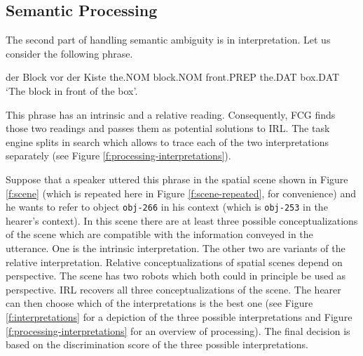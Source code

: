 \subsection{Semantic Processing}
\label{s:semantic-ambiguity-semantic}
The second part of handling semantic ambiguity is in interpretation. 
Let us consider the following phrase.
\begin{example}
\label{e:der-block-vor-der-kiste-repeated}
\gll der Block vor der Kiste 
the.NOM block.NOM front.PREP the.DAT box.DAT 
\glt `The block in front of the box'.
\glend
\end{example}
This phrase has an intrinsic and a relative reading. Consequently, FCG finds
those two readings and passes them as potential solutions to IRL. 
The task engine splits in search which allows to trace each of the two interpretations
separately (see Figure \ref{f:processing-interpretations}).

Suppose that a speaker uttered this phrase in the spatial scene 
shown in Figure \ref{f:scene} (which is repeated here in Figure \ref{f:scene-repeated}, 
for convenience) and he wants to refer to object {\footnotesize\tt obj-266} in his context (which
is {\footnotesize\tt obj-253} in the hearer's context). 
In this scene there are at least three possible conceptualizations of the
scene which are compatible with the information conveyed in the utterance. 
One is the intrinsic interpretation. The other two are variants of the relative
interpretation. Relative conceptualizations of spatial scenes depend on perspective.
The scene has two robots which both could in principle be used as perspective.
IRL recovers all three conceptualizations of the scene. The hearer can then
choose which of the interpretations is the best one (see Figure \ref{f:interpretations} for a
depiction of the three possible interpretations and Figure \ref{f:processing-interpretations} for
an overview of processing). The final decision is based 
on the discrimination score of the three possible interpretations.

